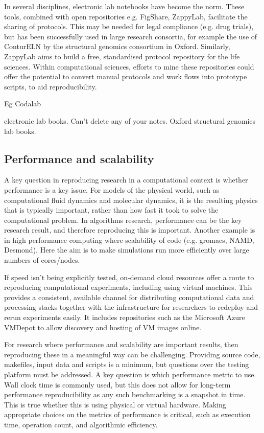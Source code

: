 \documentclass[conference]{IEEEtran}
\begin{document}
In several disciplines, electronic lab notebooks have become the
norm. These tools, combined with open repositories e.g. FigShare,
ZappyLab, facilitate the sharing of protocols. This may be needed for
legal compliance (e.g. drug trials), but has been successfully used in
large research consortia, for example the use of ConturELN by the
structural genomics consortium in Oxford. Similarly, ZappyLab aims to
build a free, standardised protocol repository for the life
sciences. Within computational sciences, efforts to mine these
repositories could offer the potential to convert manual protocols and
work flows into prototype scripts, to aid reproducibility.

Eg Codalab


electronic lab books. Can't delete any of your notes. Oxford
structural genomics lab books. 

\subsection{Performance and scalability}


A key question in reproducing research in a computational context is 
whether performance is a key issue. For models of the physical world, 
such as computational fluid dynamics and molecular dynamics, it is the 
resulting physics that is typically important, rather than how fast it took to 
solve the computational problem. In algorithms research, performance can be
the key research result, and therefore reproducing this is important. Another 
example is in high performance computing where scalability of code (e.g. gromacs,
NAMD, Desmond). Here the aim is to make simulations run more efficiently
over large numbers of cores/nodes. 

If speed isn't being explicitly tested, on-demand cloud resources 
offer a route to reproducing computational experiments, including using 
virtual machines. This provides a consistent, available channel for distributing 
computational data and processing stacks together with the infrastructure 
for researchers to redeploy and rerun experiments easily. It includes 
repositories such as the Microsoft Azure VMDepot to allow discovery 
and hosting of VM images online.

For research  where performance and scalability are important results, then 
reproducing these in a meaningful way can be challenging. Providing source
code, makefiles, input data and scripts is a minimum, but questions over the
testing platform must be addressed. A key question is which performance 
metric to use. Wall clock time is commonly used, but this does not allow for 
long-term performance reproducibility as any such benchmarking is a 
snapshot in time. This is true whether this is using physical 
or virtual hardware. Making appropriate choices on the metrics of 
performance is critical, such as execution time, operation count, and 
algorithmic efficiency.
\end{document}

